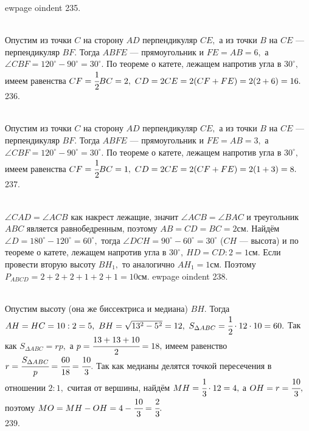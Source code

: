 ewpage
oindent
235. \begin{figure}[ht!]
\end{figure}\\
Опустим из точки $C$ на сторону $AD$ перпендикуляр $CE,$ а из точки $B$ на $CE$ --- перпендикуляр $BF.$ Тогда $ABFE$ --- прямоугольник и $FE=AB=6,$ а $\angle CBF=  120^\circ-90^\circ=30^\circ.$ По теореме о катете, лежащем напротив угла в $30^\circ,$ имеем равенства $CF=\cfrac{1}{2}BC=2,\ CD=2CE=2(CF+FE)=2(2+6)=16.$\\
236. \begin{figure}[ht!]
\end{figure}\\
Опустим из точки $C$ на сторону $AD$ перпендикуляр $CE,$ а из точки $B$ на $CE$ --- перпендикуляр $BF.$ Тогда $ABFE$ --- прямоугольник и $FE=AB=3,$ а $\angle CBF=  120^\circ-90^\circ=30^\circ.$ По теореме о катете, лежащем напротив угла в $30^\circ,$ имеем равенства $CF=\cfrac{1}{2}BC=1,\ CD=2CE=2(CF+FE)=2(1+3)=8.$\\
237. \begin{figure}[ht!]
\end{figure}\\
$\angle CAD=\angle ACB$ как накрест лежащие, значит $\angle ACB=\angle BAC$ и треугольник $ABC$ является равнобедренным, поэтому $AB=CD=BC=2$см. Найдём $\angle D=180^\circ-120^\circ=60^\circ,$ тогда $\angle DCH=90^\circ-60^\circ=30^\circ$ ($CH$ --- высота) и по теореме о катете, лежащем напротив угла в $30^\circ,\ HD=CD:2=1$см. Если провести вторую высоту $BH_1,$ то аналогично $AH_1=1$см. Поэтому $P_{ABCD}=2+2+2+1+2+1=10$см.
ewpage
oindent
238. \begin{figure}[ht!]
\end{figure}\\
Опустим высоту (она же биссектриса и медиана) $BH.$ Тогда $AH=HC=10:2=5,\ BH=\sqrt{13^2-5^2}=12,\ S_{\Delta ABC}=\cfrac{1}{2}\cdot12\cdot10=60.$ Так как $S_{\Delta ABC}=rp,$ а $p=\cfrac{13+13+10}{2}=18,$ имеем равенство $r=\cfrac{S_{\Delta ABC}}{p}=\cfrac{60}{18}=\cfrac{10}{3}.$ Так как медианы делятся точкой пересечения в отношении $2:1,$ считая от вершины, найдём $MH=\cfrac{1}{3}\cdot12=4,$ а $OH=r=\cfrac{10}{3},$ поэтому $MO=MH-OH=4-\cfrac{10}{3}=\cfrac{2}{3}.$\\
239. \begin{figure}[ht!]
\end{figure}\\
